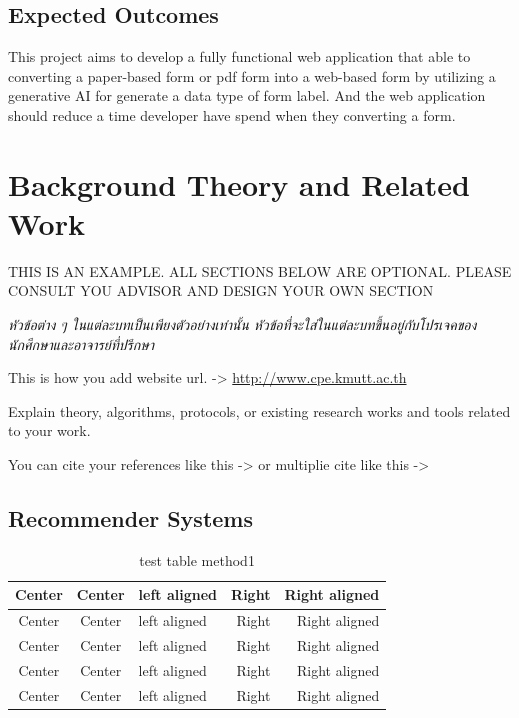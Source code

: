 \documentclass[12pt,oneside,openright,a4paper]{cpe-english-project}
\begin{document}
\section{Expected Outcomes}
This project aims to develop a fully functional web application that able to converting a paper-based form or pdf form into a web-based form by utilizing a generative AI for generate a data type of form label. And the web application should reduce a time developer have spend when they converting a form.

\chapter{Background Theory and Related Work}

THIS IS AN EXAMPLE. ALL SECTIONS BELOW ARE OPTIONAL. PLEASE CONSULT YOU ADVISOR AND DESIGN YOUR OWN SECTION

\emph{\textthai{หัวข้อต่าง ๆ ในแต่ละบทเป็นเพียงตัวอย่างเท่านั้น หัวข้อที่จะใส่ในแต่ละบทขึ้นอยู่กับโปรเจคของนักศึกษาและอาจารย์ที่ปรึกษา}}

This is how you add website url. -> \url{http://www.cpe.kmutt.ac.th}

Explain theory, algorithms, protocols, or existing research works and tools related to your work.

You can cite your references like this -> \cite{santi05b}  or multiplie cite like this -> \cite{bworld,hypersense}

\section{Recommender Systems}

\begin{table}[!h]
\caption{test table method1}\label{tbl:method1}
\begin{tabular}{c|c|l|rr} \hline\hline
Center & Center & left aligned & Right & Right aligned \\ \hline\hline
Center & Center & left aligned & Right & Right aligned \\ \hline
Center & Center & left aligned & Right & Right aligned \\ 
Center & Center & left aligned & Right & Right aligned \\ \hline
Center & Center & left aligned & Right & Right aligned \\ \hline\hline
\end{tabular}
\end{table}
\end{document}
